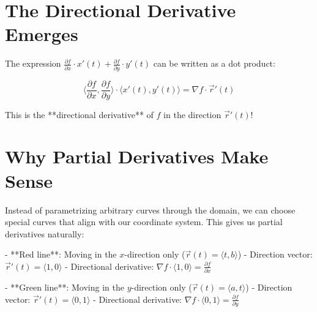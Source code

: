 \documentclass{ximera}
\begin{document}
\section*{The Directional Derivative Emerges}

The expression $\frac{\partial f}{\partial x} \cdot x'(t) + \frac{\partial f}{\partial y} \cdot y'(t)$ can be written as a dot product:

$$\langle \frac{\partial f}{\partial x}, \frac{\partial f}{\partial y} \rangle \cdot \langle x'(t), y'(t) \rangle = \nabla f \cdot \vec{r}'(t)$$

This is the **directional derivative** of $f$ in the direction $\vec{r}'(t)$!

\section*{Why Partial Derivatives Make Sense}

Instead of parametrizing arbitrary curves through the domain, we can choose special curves that align with our coordinate system. This gives us partial derivatives naturally:


- **Red line**: Moving in the $x$-direction only ($\vec{r}(t) = \langle t, b \rangle$)
  - Direction vector: $\vec{r}'(t) = \langle 1, 0 \rangle$
  - Directional derivative: $\nabla f \cdot \langle 1, 0 \rangle = \frac{\partial f}{\partial x}$

- **Green line**: Moving in the $y$-direction only ($\vec{r}(t) = \langle a, t \rangle$)
  - Direction vector: $\vec{r}'(t) = \langle 0, 1 \rangle$  
  - Directional derivative: $\nabla f \cdot \langle 0, 1 \rangle = \frac{\partial f}{\partial y}$
\end{document}
